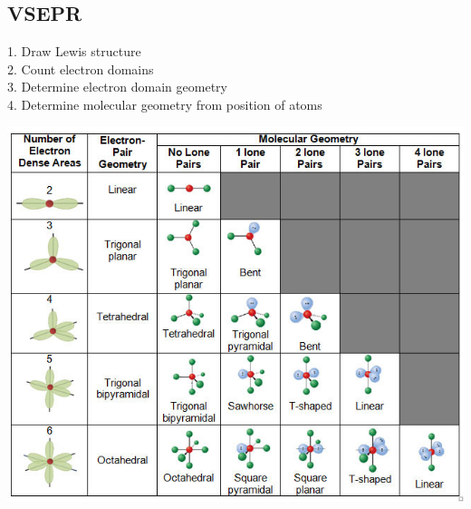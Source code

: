 \subsection{VSEPR}
1. Draw Lewis structure\\
2. Count electron domains\\
3. Determine electron domain geometry\\
4. Determine molecular geometry from position of atoms
\begin{center}
  \includegraphics[width = 0.88 \linewidth]{images/VSEPR_model.jpg}  
\end{center}
